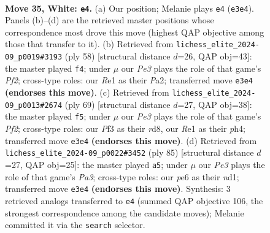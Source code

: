 \documentclass[11pt]{article}
\begin{document}
\clearpage

\begin{figure}[p]\centering
\begin{subfigure}{0.46\textwidth}\centering
\resizebox{\linewidth}{!}{%
\newchessgame
\chessboard[
  setfen={1r6/1p3pk1/p3p3/8/P7/4PP1P/1R5P/4R1K1 w - - 1 35},
  showmover=false,
  pgfstyle=straightmove, color=movearrow, markmove={e3-e4}
]}
\caption{}
\end{subfigure}\hfill
\begin{subfigure}{0.46\textwidth}\centering
\resizebox{\linewidth}{!}{%
\newchessgame
\chessboard[
  setfen={2r2k2/6p1/p1p4p/5P2/8/7P/P4PP1/2R3K1 w - - 2 30},
  showmover=false,
  pgfstyle=straightmove, color=movearrow, markmove={f2-f4}
]}
\caption{}
\end{subfigure}
\\[4pt]
\begin{subfigure}{0.46\textwidth}\centering
\resizebox{\linewidth}{!}{%
\newchessgame
\chessboard[
  setfen={3R4/p1r2pk1/1p6/8/1P5P/2P5/1P6/2K5 b - - 3 35},
  showmover=false,
  pgfstyle=straightmove, color=movearrow, markmove={f7-f5}
]}
\caption{}
\end{subfigure}\hfill
\begin{subfigure}{0.46\textwidth}\centering
\resizebox{\linewidth}{!}{%
\newchessgame
\chessboard[
  setfen={3r3k/2r4p/p5p1/2PP4/1P1R4/8/3p2K1/3N4 b - - 0 43},
  showmover=false,
  pgfstyle=straightmove, color=movearrow, markmove={a6-a5}
]}
\caption{}
\end{subfigure}
\caption{\textbf{Move 35, White: \texttt{e4}.} (a) Our position; Melanie plays \texttt{e4} (\texttt{e3e4}). Panels (b)--(d) are the retrieved master positions whose correspondence most drove this move (highest QAP objective among those that transfer to it). (b) Retrieved from \texttt{lichess\_elite\_2024-09\_p0019\#3193} (ply 58) [structural distance $d$=26, QAP obj=43]: the master played \texttt{f4}; under $\mu$ our \emph{Pe3} plays the role of that game's \emph{Pf2}; cross-type roles: our \emph{R}e1 as their \emph{P}a2; transferred move \texttt{e3e4} \textbf{(endorses this move)}. (c) Retrieved from \texttt{lichess\_elite\_2024-09\_p0013\#2674} (ply 69) [structural distance $d$=27, QAP obj=38]: the master played \texttt{f5}; under $\mu$ our \emph{Pe3} plays the role of that game's \emph{Pf2}; cross-type roles: our \emph{P}f3 as their \emph{r}d8, our \emph{R}e1 as their \emph{p}h4; transferred move \texttt{e3e4} \textbf{(endorses this move)}. (d) Retrieved from \texttt{lichess\_elite\_2024-09\_p0022\#3452} (ply 85) [structural distance $d$=27, QAP obj=25]: the master played \texttt{a5}; under $\mu$ our \emph{Pe3} plays the role of that game's \emph{Pa3}; cross-type roles: our \emph{p}e6 as their \emph{n}d1; transferred move \texttt{e3e4} \textbf{(endorses this move)}. Synthesis: 3 retrieved analogs transferred to \texttt{e4} (summed QAP objective 106, the strongest correspondence among the candidate moves); Melanie committed it via the \texttt{search} selector.}
\label{fig:thought-m68}
\end{figure}
\end{document}
